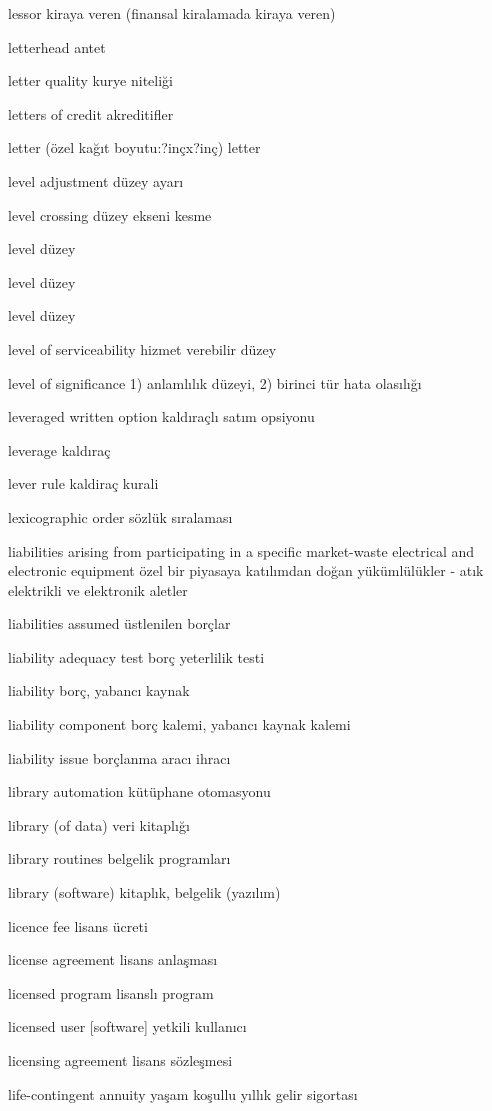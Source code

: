 \documentclass[12pt,fleqn]{article}\usepackage{../../common}
\begin{document}
lessor kiraya veren (finansal kiralamada kiraya veren)

letterhead antet

letter quality kurye niteliği

letters of credit akreditifler

letter (özel kağıt boyutu:?inçx?inç) letter

level adjustment düzey ayarı

level crossing düzey ekseni kesme

level düzey

level düzey

level düzey

level of serviceability hizmet verebilir düzey

level of significance 1) anlamlılık düzeyi, 2) birinci tür hata olasılığı

leveraged written option kaldıraçlı satım opsiyonu

leverage kaldıraç

lever rule kaldiraç kurali

lexicographic order sözlük sıralaması

liabilities arising from participating in a specific market-waste electrical and electronic equipment özel bir piyasaya katılımdan doğan yükümlülükler - atık elektrikli ve elektronik aletler

liabilities assumed üstlenilen borçlar

liability adequacy test borç yeterlilik testi

liability borç, yabancı kaynak

liability component borç kalemi, yabancı kaynak kalemi

liability issue borçlanma aracı ihracı

library automation kütüphane otomasyonu

library (of data) veri kitaplığı

library routines belgelik programları

library (software) kitaplık, belgelik (yazılım)

licence fee lisans ücreti

license agreement lisans anlaşması

licensed program lisanslı program

licensed user [software] yetkili kullanıcı

licensing agreement lisans sözleşmesi

life-contingent annuity yaşam koşullu yıllık gelir sigortası
\end{document}
